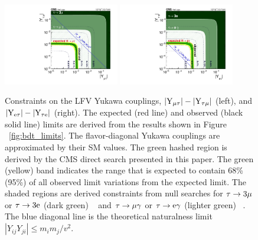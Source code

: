 \begin{figure}[htbp!]
  \centering
  \includegraphics[width=0.45\textwidth]{plots/chapter9/limits/Ymt.pdf}
  \includegraphics[width=0.45\textwidth]{plots/chapter9/limits/Yet.pdf} \\
  \caption{Constraints on the LFV Yukawa couplings, $|\text{Y}_{\mu\tau}|-|\text{Y}_{\tau\mu}|$ (left), and $|\text{Y}_{\text{e}\tau}|-|\text{Y}_{\tau\text{e}}|$ (right). The expected (red line) and observed (black solid line) limits are derived from the results shown in Figure ~\ref{fig:bdt_limits}. The flavor-diagonal Yukawa couplings are approximated by their SM values. The green hashed region is derived by the CMS direct search presented in this paper. The green (yellow) band indicates the range that is expected to contain 68\% (95\%) of all observed limit variations from the expected limit. The shaded regions are derived constraints from null searches for $\tau\to3\mu$ or $\tau\to3\text{e}$ (dark green) ~\cite{Hayasaka:2010np} and $\tau\to\mu\gamma$ or $\tau\to\text{e}\gamma$ (lighter green) ~\cite{Harnik:2012pb}. The blue diagonal line is the theoretical naturalness limit $|Y_{ij}Y_{ji}|\leq{m_i}m_j/v^2$.}
  \label{fig:bdt_yukawa_limits}
\end{figure}






